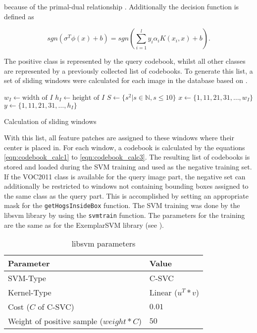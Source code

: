 because of the primal-dual relationship \cite{UBHD-66487423}. Additionally the decision function is defined as

\begin{equation}
sgn(\sigma^T \phi(x) + b) = sgn(\sum_{i=1}^{l} y_i \alpha_i K(x_i, x) + b).
\end{equation}

The positive class is represented by the query codebook, whilst all other classes are represented by a previously collected list of codebooks. To generate this list, a set of sliding windows were calculated for each image in the database based on .

\begin{algorithm}
    $w_I \gets \text{width of }I$\;
    $h_I \gets \text{height of }I$\;
    $S \gets \{s^2 | s \in \mathbb{N}, s \le 10 \}$\;
    $x \gets \{1, 11, 21, 31,\dots, w_I\}$\;
    $y \gets \{1, 11, 21, 31,\dots, h_I\}$\;
    \caption{Calculation of sliding windows}
    \label{alg:calc_windows}
\end{algorithm}

With this list, all feature patches are assigned to these windows where their center is placed in. For each window, a codebook is calculated by the equations \ref{eqn:codebook_calc1} to \ref{eqn:codebook_calc3}. The resulting list of codebooks is stored and loaded during the \ac{SVM} training and used as the negative training set. If the \ac{VOC2011} class is available for the query image part, the negative set can additionally be restricted to windows not containing bounding boxes assigned to the same class as the query part. This is accomplished by setting an appropriate mask for the \verb|getHogsInsideBox| function. The \ac{SVM} training was done by the libsvm library \cite{Chang:2011:LLS:1961189.1961199} by using the \texttt{svmtrain} function. The parameters for the training are the same as for the ExemplarSVM library \cite{Malisiewicz2011} (see ).

\begin{table}
    \begin{tabular}{|l|l|}
        \hline
        \textbf{Parameter}   & \textbf{Value} \\ 
        \hline
        SVM-Type             & C-SVC \\ 
        \hline
        Kernel-Type          & Linear ($u^T*v$) \\ 
        \hline
        Cost ($C$ of C-SVC)  & $0.01$ \\ 
        \hline
        Weight of positive sample ($weight*C$) & $50$ \\ 
        \hline
    \end{tabular}
    \caption{libsvm parameters}
    \label{tab:libsvm_train_params}
\end{table}

